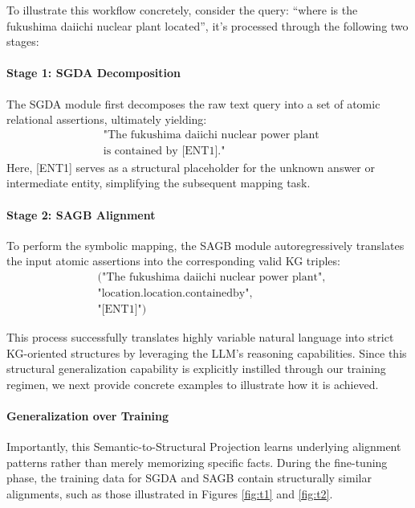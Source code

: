 \documentclass[11pt]{article}
\begin{document}
To illustrate this workflow concretely, consider the query: ``where is the fukushima daiichi nuclear plant located'', it's processed through the following two stages:

\paragraph{Stage 1: SGDA Decomposition} 
The SGDA module first decomposes the raw text query into a set of atomic relational assertions, ultimately yielding:
\begin{align*}
&\text{"The fukushima daiichi nuclear power plant } \\
&\text{is contained by [ENT1]."}
\end{align*}
Here, [ENT1] serves as a structural placeholder for the unknown answer or intermediate entity, simplifying the subsequent mapping task.

\paragraph{Stage 2: SAGB Alignment} 
To perform the symbolic mapping, the SAGB module autoregressively translates the input atomic assertions into the corresponding valid KG triples:
\begin{align*}
&\text{("The fukushima daiichi nuclear power plant", } \\
&\text{"location.location.containedby",} \\
&\text{"[ENT1]")}
\end{align*}

This process successfully translates highly variable natural language into strict KG-oriented structures by leveraging the LLM's reasoning capabilities. Since this structural generalization capability is explicitly instilled through our training regimen, we next provide concrete examples to illustrate how it is achieved.

\paragraph{Generalization over Training}
Importantly, this Semantic-to-Structural Projection learns underlying alignment patterns rather than merely memorizing specific facts. During the fine-tuning phase, the training data for SGDA and SAGB contain structurally similar alignments, such as those illustrated in Figures \ref{fig:t1} and \ref{fig:t2}.
\end{document}
